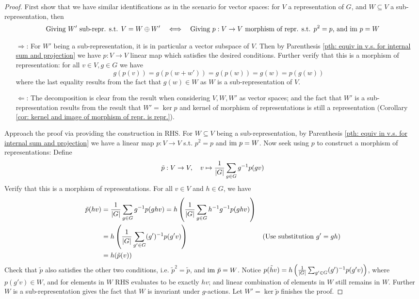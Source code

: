 \documentclass{article}
\begin{document}
\begin{proof}
    First show that we have similar identifications as in the scenario for vector spaces: for $V$ a representation of $G$, and $W \subseteq V$ a sub-representation, then
    \[
        \text{Giving $W'$ sub-repr. s.t. $V = W \oplus W'$} \quad \Longleftrightarrow \quad \text{Giving $p: V \to V$ morphism of repr. s.t. $p^2 = p$, and $\mathrm{im}\  p = W$}
    \]
    \begin{itemize}
        \item[$\Rightarrow$:] For $W'$ being a sub-representation, it is in particular a vector subspace of $V$. Then by Parenthesis \ref{pth: equiv in v.s. for internal sum and projection} we have $p: V \to V$ linear map which satisfies the desired conditions. Further verify that this is a morphism of representation: for all $v \in V, g \in G$ we have
        \[
            g(p(v)) = g(p(w + w')) = g(p(w)) = g(w) = p(g(w))
        \]
        where the last equality results from the fact that $g(w) \in W$ as $W$ is a sub-representation of $V$. 
        \item[$\Leftarrow$:] The decomposition is clear from the result when considering $V, W, W'$ as vector spaces; and the fact that $W'$ is a sub-representation results from the result that $W' = \ker p$ and kernel of morphism of representations is still a representation (Corollary \ref{cor: kernel and image of morphism of repr. is repr.}).
    \end{itemize}
    Approach the proof via providing the construction in RHS. For $W \subseteq V$ being a sub-representation, by Parenthesis \ref{pth: equiv in v.s. for internal sum and projection} we have a linear map $p: V \to V$ s.t. $p^2 = p$ and $\mathrm{im}\  p = W$. Now seek using $p$ to construct a morphism of representations: Define 
    \[
        \tilde{p}: V \to V, \quad v \mapsto \frac{1}{\left|G\right|} \sum_{g \in G} g^{-1} p(gv)
    \]
    Verify that this is a morphism of representations. For all $v \in V$ and $h \in G$, we have
    \begin{align*}
        \tilde{p}(hv)
        & = \frac{1}{\left|G\right|} \sum_{g \in G} g^{-1} p(ghv) = h \left( \frac{1}{\left|G\right|} \sum_{g \in G} h^{-1} g^{-1} p(ghv) \right) \\
        & = h\left(\frac{1}{\left|G\right|} \sum_{g' \in G} (g')^{-1} p(g'v) \right) & (\text{Use substitution $g' = gh$}) \\
        & = h(\tilde{p}(v))
    \end{align*}
    Check that $\tilde{p}$ also satisfies the other two conditions, i.e. $\tilde{p}^2 = \tilde{p}$, and $\mathrm{im}\  \tilde{p} = W$. Notice $\tilde{p(hv)} = h\left(\frac{1}{\left|G\right|} \sum_{g' \in G} (g')^{-1} p(g'v) \right)$, where $p(g'v) \in W$, and for elements in $W$ RHS evaluates to be exactly $hv$; and linear combination of elements in $W$ still remains in $W$. Further $W$ is a sub-representation gives the fact that $W$ is invariant under $g$-actions. Let $W' = \ker \tilde{p}$ finishes the proof.
\end{proof}
\end{document}
